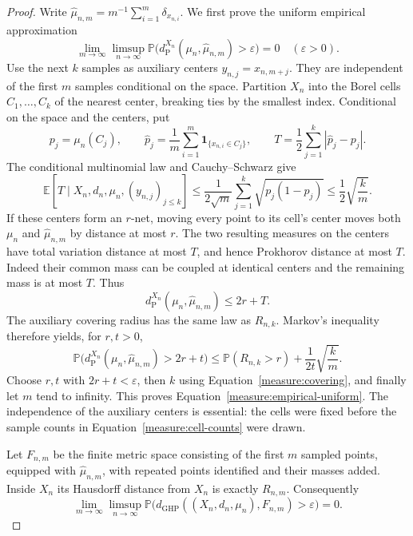 \begin{proof}
Write $\widehat\mu_{n,m}=m^{-1}\sum_{i=1}^m\delta_{x_{n,i}}$.
We first prove the uniform empirical approximation
\begin{equation}\label{measure:empirical-uniform}
 \lim_{m\to\infty}\limsup_{n\to\infty}
 \mathbb P\bigl(d_{\mathrm P}^{X_n}(\mu_n,\widehat\mu_{n,m})
                     >\varepsilon\bigr)=0
 \quad(\varepsilon>0).
\end{equation}
Use the next $k$ samples as auxiliary centers
$y_{n,j}=x_{n,m+j}$. They are independent of the first $m$ samples
conditional on the space. Partition $X_n$ into the Borel cells
$C_1,\ldots,C_k$ of the nearest center, breaking ties by the smallest
index. Conditional on the space and the centers, put
\[
 p_j=\mu_n(C_j),\qquad
 \widehat p_j=\frac1m\sum_{i=1}^m\mathbf1_{\{x_{n,i}\in C_j\}},
 \qquad T=\frac12\sum_{j=1}^k|\widehat p_j-p_j|.
\]
The conditional multinomial law and Cauchy--Schwarz give
\begin{equation}\label{measure:cell-counts}
 \mathbb E[T\mid X_n,d_n,\mu_n,(y_{n,j})_{j\leq k}]
 \leq \frac1{2\sqrt m}\sum_{j=1}^k\sqrt{p_j(1-p_j)}
 \leq\frac12\sqrt{\frac{k}{m}}.
\end{equation}
If these centers form an $r$-net, moving every point to its cell's
center moves both $\mu_n$ and $\widehat\mu_{n,m}$ by distance at most
$r$. The two resulting measures on the centers have total variation
distance at most $T$, and hence Prokhorov distance at most $T$.
Indeed their common mass can be coupled at identical centers and the
remaining mass is at most $T$. Thus
\[
 d_{\mathrm P}^{X_n}(\mu_n,\widehat\mu_{n,m})\leq 2r+T.
\]
The auxiliary covering radius has the same law as $R_{n,k}$. Markov's
inequality therefore yields, for $r,t>0$,
\begin{equation}\label{measure:empirical-bound}
 \mathbb P\bigl(d_{\mathrm P}^{X_n}(\mu_n,\widehat\mu_{n,m})
                         >2r+t\bigr)
 \leq \mathbb P(R_{n,k}>r)+\frac1{2t}\sqrt{\frac{k}{m}}.
\end{equation}
Choose $r,t$ with $2r+t<\varepsilon$, then $k$ using
Equation~\eqref{measure:covering}, and finally let $m$ tend to infinity.
This proves Equation~\eqref{measure:empirical-uniform}. The independence
of the auxiliary centers is essential: the cells were fixed before
the sample counts in Equation~\eqref{measure:cell-counts} were drawn.

Let $F_{n,m}$ be the finite metric space consisting of the first $m$
sampled points, equipped with $\widehat\mu_{n,m}$, with repeated points
identified and their masses added. Inside $X_n$ its Hausdorff distance
from $X_n$ is exactly $R_{n,m}$. Consequently
\begin{equation}\label{measure:finite-approximation}
 \lim_{m\to\infty}\limsup_{n\to\infty}
 \mathbb P\bigl(d_{\mathrm{GHP}}((X_n,d_n,\mu_n),F_{n,m})
                                      >\varepsilon\bigr)=0.
\end{equation}


\end{proof}
